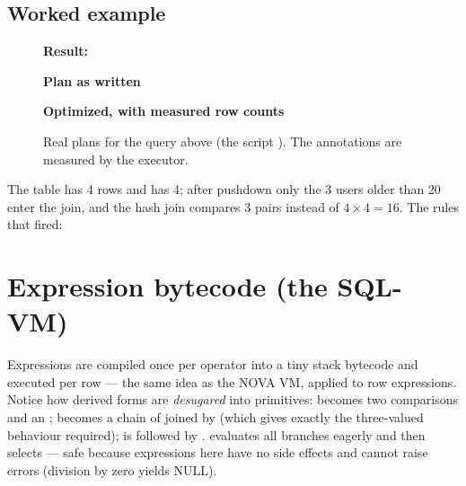 \subsection{Worked example}
\begin{figure}[H]
\begin{minipage}[t]{0.49\textwidth}\begingroup\lstset{style=tiny}\endgroup\end{minipage}\hfill
\begin{minipage}[t]{0.47\textwidth}\textbf{Result:}\\[-6pt]\begingroup\lstset{style=tiny}\endgroup\end{minipage}
\end{figure}

\begin{figure}[H]
\begin{minipage}[t]{0.47\textwidth}\textbf{Plan as written}\\[-6pt]\begingroup\lstset{style=tiny}\endgroup\end{minipage}\hfill
\begin{minipage}[t]{0.51\textwidth}\textbf{Optimized, with measured row counts}\\[-6pt]\begingroup\lstset{style=tiny}\endgroup\end{minipage}
\caption{Real plans for the query above (the script ). The \code{[rows=N]} annotations are measured by the executor.}
\end{figure}

The  table has 4 rows and  has 4; after pushdown only the 3 users older than 20 enter the join, and the hash join compares 3 pairs instead of $4\times4=16$. The rules that fired:

\begin{table}[H]\centering\small\caption{Optimizer history of the query above (real output).}\end{table}


\section{Expression bytecode (the SQL-VM)}
Expressions are compiled once per operator into a tiny stack bytecode and executed per row --- the same idea as the NOVA VM, applied to row expressions. Notice how derived forms are \emph{desugared} into primitives:  becomes two comparisons and an ;  becomes a chain of \code{=} joined by  (which gives exactly the three-valued behaviour required);  is  followed by .  evaluates all branches eagerly and then selects --- safe because expressions here have no side effects and cannot raise errors (division by zero yields NULL).

